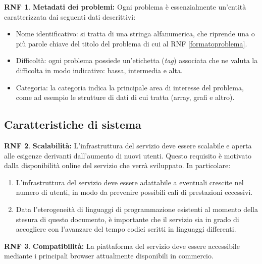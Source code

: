 \documentclass[11pt, a4paper]{article}
\theoremstyle{definition}
\newtheorem{nonfuncreq}{RNF} %
\begin{document}
\begin{nonfuncreq}
\label{metadata}
\textbf{Metadati dei problemi:} Ogni problema è essenzialmente un'entità
caratterizzata dai seguenti dati descrittivi:
\begin{itemize}
    \item Nome identificativo: si tratta di una stringa alfanumerica, che
    riprende una o più parole chiave del titolo del problema di cui al
    RNF \ref{formatoproblema}.
    
    \item Difficoltà: ogni problema possiede un'etichetta (\textit{tag})
    associata che ne valuta la difficolta in modo indicativo: bassa,
    intermedia e alta.

    \item Categoria: la categoria indica la principale area di interesse
    del problema, come ad esempio le strutture di dati di cui tratta
    (array, grafi e altro).
\end{itemize}
\end{nonfuncreq}

\subsection{Caratteristiche di sistema}

\begin{nonfuncreq}
\label{scalabilita}
\textbf{Scalabilità:}
L'infrastruttura del servizio deve essere scalabile e aperta alle esigenze
derivanti dall'aumento di nuovi utenti. Questo requisito è motivato dalla
disponibilità online del servizio che verrà sviluppato. In particolare:
\begin{enumerate}
    \item L'infrastruttura del servizio deve essere adattabile a eventuali
    crescite nel numero di utenti, in modo da prevenire possibili cali di
    prestazioni eccessivi.

    \item Data l'eterogeneità di linguaggi di programmazione esistenti
    al momento della stesura di questo documento, è importante che il
    servizio sia in grado di accogliere con l'avanzare del tempo codici
    scritti in linguaggi differenti.
\end{enumerate}
\end{nonfuncreq}

\begin{nonfuncreq}
\label{compatibility}
\textbf{Compatibilità:}
La piattaforma del servizio deve essere accessibile mediante i principali
browser attualmente disponibili in commercio.
\end{nonfuncreq}
\end{document}
